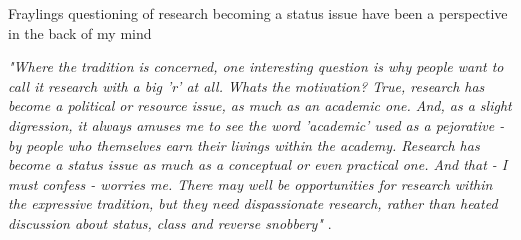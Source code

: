 Fraylings questioning of research becoming a status issue have been a perspective in the back of my mind 

\emph{"Where the tradition is concerned, one interesting question is why people want to call it research with a big 'r' at all. Whats the motivation? True, research has become a political or resource issue, as much as an academic one. And, as a slight digression, it always amuses me to see the word 'academic' used as a pejorative - by people who themselves earn their livings within the academy. Research has become a status issue as much as a conceptual or even practical one. And that - I must confess - worries me. There may well be opportunities for research within the expressive tradition, but they need dispassionate research, rather than heated discussion about status, class and reverse snobbery"} \autocite[p. 5]{frayling_1994}.

\par

\begin{comment}
\subsection{form, fit, context: learning about the context }

I believe, as a first step, it is important to try to be as fully immersed in the existing context of ‘what Klimahuset is’, as possible. Before thinking about what form the installation should have, I need a thorough understanding of the context the installation is to be placed in, to be able to start shaping the form. The existing context will also set some constraints for what kind of fit the installation will have in the context, a fit that will be continually evaluated throughout the design process. 


In the documents I have gotten access to from Klimahuset, there is a great focus on the buildings architecture. Design and architecture goes hand in hand, and the architectural outline of the exhibition space, sets creative constraints and limits for what the installation can be. It is also the “opportunity space” (mulighetsrom) I have available in the design of the installation. It is therefore important for me to know the “material”, thoughts and reasoning behind it.
\end{comment}

